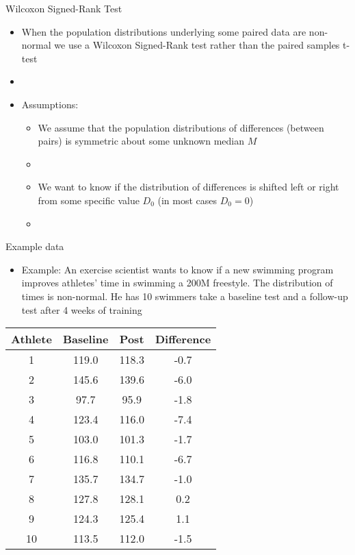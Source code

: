 \documentclass[xcolor=dvipsnames]{beamer}
\begin{document}
\begin{frame}{Wilcoxon Signed-Rank Test}
	\begin{itemize}
		\item When the population distributions underlying some paired data are non-normal we use a Wilcoxon Signed-Rank test rather than the paired samples t-test \pause
		\item[]
		\item Assumptions: \pause
		\begin{itemize}
			\item We assume that the population distributions of differences (between pairs) is symmetric about some unknown median $M$ \pause
			\item[]
			\item We want to know if the distribution of differences is shifted left or right from some specific value $D_0$ (in most cases $D_0 = 0$) \pause
			\item[]
		\end{itemize}
	\end{itemize}
\end{frame}

\begin{frame}{Example data}
\begin{itemize}
			\item Example: An exercise scientist wants to know if a new swimming program improves athletes' time in swimming a 200M freestyle. The distribution of times is non-normal. He has 10 swimmers take a baseline test and a follow-up test after 4 weeks of training
\end{itemize}
	\begin{center}
		\begin{tabular}{|c|c|c|c|}
			\hline
			  \textbf{Athlete} &  \textbf{Baseline} &      \textbf{Post}    & \textbf{Difference} \\ \hline 
			  \hline
1  &     119.0 &  118.3 &  -0.7\\ \hline
2   &    145.6 &  139.6 &  -6.0\\ \hline
3    &    97.7 &   95.9 &  -1.8\\ \hline
4    &   123.4 &  116.0 &  -7.4\\ \hline
5    &   103.0 &  101.3 &  -1.7\\ \hline
6    &   116.8 &  110.1 &  -6.7\\ \hline
7     &  135.7 &  134.7 &  -1.0\\ \hline
8     &  127.8 &  128.1 &   0.2\\ \hline
9     &  124.3 &  125.4 &   1.1\\ \hline
10    &  113.5 &  112.0 &  -1.5\\ \hline
		\end{tabular}
	\end{center}
\end{frame}
\end{document}
